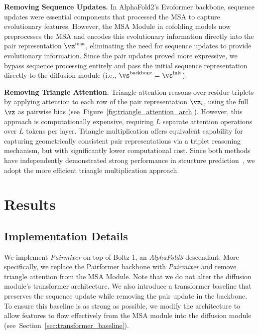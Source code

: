 \documentclass{article} %
\renewcommand{\paragraph}[1]{\vspace{1.25mm}\noindent\textbf{#1}}
\newcommand{\reffig}[1]{Figure~\ref{fig:#1}}
\newcommand{\refsec}[1]{Section~\ref{sec:#1}}
\def\name{{\textit{Pairmixer}}\xspace}
\def\af{{\textit{AlphaFold3}}\xspace}
\begin{document}
\paragraph{Removing Sequence Updates.}
In AlphaFold2's Evoformer backbone, sequence updates were essential components that processed the MSA to capture evolutionary features.
However, the MSA Module in cofolding models now preprocesses the MSA and encodes this evolutionary information directly into the pair representation $\vz^{\text{msa}}$, eliminating the need for sequence updates to provide evolutionary information.
Since the pair updates proved more expressive, we bypass sequence processing entirely and pass the initial sequence representation directly to the diffusion module (i.e., $\vs^{\text{backbone}} = \vs^{\text{init}}$).

\paragraph{Removing Triangle Attention.}
Triangle attention reasons over residue triplets by applying attention to each row of the pair representation $\vz_i$, using the full $\vz$ as pairwise bias (see~\reffig{triangle_attention_arch}).
However, this approach is computationally expensive, requiring $L$ separate attention operations over $L$ tokens per layer.
Triangle multiplication offers equivalent capability for capturing geometrically consistent pair representations via a triplet reasoning mechanism, but with significantly lower computational cost.
Since both methods have independently demonstrated strong performance in structure prediction~\citep{jumper2021alphafold2}, we adopt the more efficient triangle multiplication approach.






\section{Results}

\subsection{Implementation Details}

We implement \name on top of Boltz-1, an \af descendant.
More specifically, we replace the Pairformer backbone with \name and remove triangle attention from the MSA Module.
Note that we do not alter the diffusion module's transformer architecture.
We also introduce a transformer baseline that preserves the sequence update while removing the pair update in the backbone.
To ensure this baseline is as strong as possible, we modify the architecture to allow features to flow effectively from the MSA module into the diffusion module (see~\refsec{transformer_baseline}).
\end{document}
